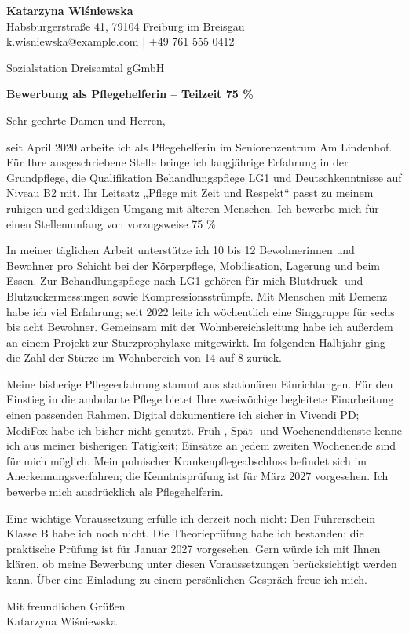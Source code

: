 \documentclass[11pt,a4paper]{article}
\begin{document}
{\large\bfseries\color{primarycolor} Katarzyna Wiśniewska}\\
Habsburgerstraße 41, 79104 Freiburg im Breisgau\\
k.wisniewska@example.com | +49 761 555 0412

\vspace{0.5em}
Sozialstation Dreisamtal gGmbH

\vspace{0.4em}
\textbf{\color{primarycolor} Bewerbung als Pflegehelferin – Teilzeit 75 \%}

Sehr geehrte Damen und Herren,

seit April 2020 arbeite ich als Pflegehelferin im Seniorenzentrum Am Lindenhof. Für Ihre ausgeschriebene Stelle bringe ich langjährige Erfahrung in der Grundpflege, die Qualifikation Behandlungspflege LG1 und Deutschkenntnisse auf Niveau B2 mit. Ihr Leitsatz „Pflege mit Zeit und Respekt“ passt zu meinem ruhigen und geduldigen Umgang mit älteren Menschen. Ich bewerbe mich für einen Stellenumfang von vorzugsweise 75 \%.

In meiner täglichen Arbeit unterstütze ich 10 bis 12 Bewohnerinnen und Bewohner pro Schicht bei der Körperpflege, Mobilisation, Lagerung und beim Essen. Zur Behandlungspflege nach LG1 gehören für mich Blutdruck- und Blutzuckermessungen sowie Kompressionsstrümpfe. Mit Menschen mit Demenz habe ich viel Erfahrung; seit 2022 leite ich wöchentlich eine Singgruppe für sechs bis acht Bewohner. Gemeinsam mit der Wohnbereichsleitung habe ich außerdem an einem Projekt zur Sturzprophylaxe mitgewirkt. Im folgenden Halbjahr ging die Zahl der Stürze im Wohnbereich von 14 auf 8 zurück.

Meine bisherige Pflegeerfahrung stammt aus stationären Einrichtungen. Für den Einstieg in die ambulante Pflege bietet Ihre zweiwöchige begleitete Einarbeitung einen passenden Rahmen. Digital dokumentiere ich sicher in Vivendi PD; MediFox habe ich bisher nicht genutzt. Früh-, Spät- und Wochenenddienste kenne ich aus meiner bisherigen Tätigkeit; Einsätze an jedem zweiten Wochenende sind für mich möglich. Mein polnischer Krankenpflegeabschluss befindet sich im Anerkennungsverfahren; die Kenntnisprüfung ist für März 2027 vorgesehen. Ich bewerbe mich ausdrücklich als Pflegehelferin.

Eine wichtige Voraussetzung erfülle ich derzeit noch nicht: Den Führerschein Klasse B habe ich noch nicht. Die Theorieprüfung habe ich bestanden; die praktische Prüfung ist für Januar 2027 vorgesehen. Gern würde ich mit Ihnen klären, ob meine Bewerbung unter diesen Voraussetzungen berücksichtigt werden kann. Über eine Einladung zu einem persönlichen Gespräch freue ich mich.

Mit freundlichen Grüßen\\[0.5em]
Katarzyna Wiśniewska
\end{document}
